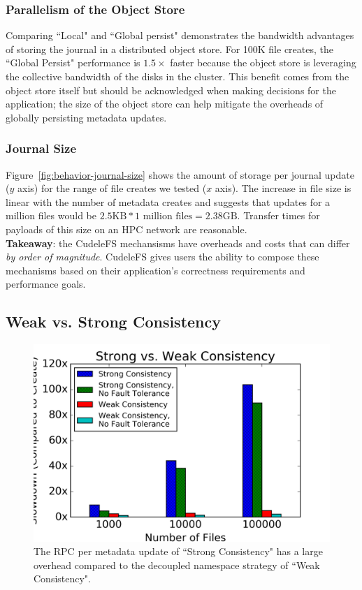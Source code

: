 \subsubsection{Parallelism of the Object Store} Comparing ``Local" and ``Global
persist" demonstrates the bandwidth advantages of storing the journal in a
distributed object store. For 100K file creates, the ``Global Persist"
performance is \(1.5\times\) faster because the object store is leveraging the
collective bandwidth of the disks in the cluster. This benefit comes from the
object store itself but should be acknowledged when making decisions for the
application; the size of the object store can help mitigate the overheads of
globally persisting metadata updates.

\subsubsection{Journal Size} Figure~\ref{fig:behavior-journal-size} shows the
amount of storage per journal update (\(y\) axis) for the range of file creates
we tested (\(x\) axis). The increase in file size is linear with the number of
metadata creates and suggests that updates for a million files would be
\(2.5\text{KB}*1\text{ million files} = 2.38\text{GB}\). Transfer times for
payloads of this size on an HPC network are reasonable.\\

\noindent\textbf{Takeaway}: the CudeleFS mechansisms have overheads and costs
that can differ {\it by order of magnitude}. CudeleFS gives users the ability
to compose these mechanisms based on their application's correctness
requirements and performance goals.

\subsection{Weak vs. Strong Consistency}
\begin{figure}[tb]
\centering
\includegraphics[width=1.0\linewidth]{graphs/slowdown-strong-v-weak.png}
\caption{The RPC per metadata update of ``Strong Consistency" has a large
overhead compared to the decoupled namespace strategy of ``Weak
Consistency".\label{fig:slowdown-strong-weak}}
\end{figure}

